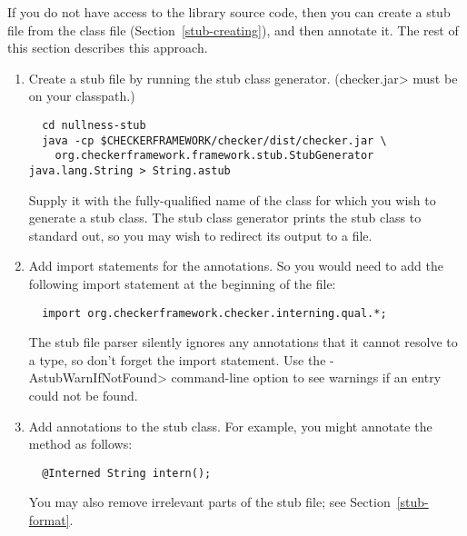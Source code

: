
If you do not have access to the library source code, then you can create a
stub file from the class file (Section~\ref{stub-creating}),
and then annotate it.  The rest of this section describes this approach.


\begin{enumerate}

\item
  Create a stub file by running the stub class generator.  (\<checker.jar> must be on your classpath.)

\begin{Verbatim}
  cd nullness-stub
  java -cp $CHECKERFRAMEWORK/checker/dist/checker.jar \
    org.checkerframework.framework.stub.StubGenerator java.lang.String > String.astub
\end{Verbatim}

  Supply it with the fully-qualified name of the class for which you wish to
  generate a stub class.  The stub class generator prints the
  stub class to standard out, so you may wish to redirect its output to a
  file.

\item
  Add import statements for the annotations.  So you would need to
add the following import statement at the beginning of the file:

\begin{Verbatim}
  import org.checkerframework.checker.interning.qual.*;
\end{Verbatim}

\noindent
The stub file parser silently ignores any annotations that it cannot
resolve to a type, so don't forget the import statement.
Use the \<-AstubWarnIfNotFound> command-line option to see warnings
if an entry could not be found.

\item
  Add annotations to the stub class.  For example, you might annotate
  the  method as follows:

\begin{Verbatim}
  @Interned String intern();
\end{Verbatim}

  You may also remove irrelevant parts of the stub file; see
  Section~\ref{stub-format}.

\end{enumerate}



